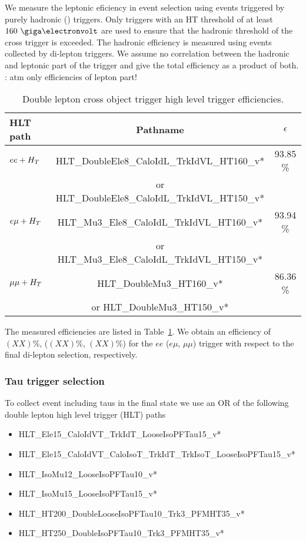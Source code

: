 We measure the leptonic eficiency in event selection
using events triggered by purely hadronic (\HT) triggers. Only triggers with an HT threshold of at least $160~\GeV$ are used to ensure that the hadronic threshold of the cross trigger is exceeded.
The hadronic efficiency is measured using
events collected by di-lepton triggers. We assume
no correlation between the hadronic and leptonic
part of the trigger and give the total efficiency
as a product of both.\\
\TODO: atm only efficiencies of lepton part!

\begin{table}[hbtp]
\caption{Double lepton \HT cross object trigger high level trigger efficiencies. \label{tab:TriggerHT}}
\begin{center}
\begin{tabular}{|l||c|c|} \hline
HLT path    &   Pathname        & $\epsilon$\\\hline \hline
$ee + H_T~$ &  HLT\_DoubleEle8\_CaloIdL\_TrkIdVL\_HT160\_v* & 93.85 \%\\
 & or HLT\_DoubleEle8\_CaloIdL\_TrkIdVL\_HT150\_v* & \\\hline
$e\mu + H_T~$& HLT\_Mu3\_Ele8\_CaloIdL\_TrkIdVL\_HT160\_v*  & 93.94 \%\\
 & or HLT\_Mu3\_Ele8\_CaloIdL\_TrkIdVL\_HT150\_v* & \\\hline
$\mu\mu + H_T~$& HLT\_DoubleMu3\_HT160\_v* & 86.36 \%\\
 & or HLT\_DoubleMu3\_HT150\_v* & \\\hline
\end{tabular}
\end{center}
\end{table}

The measured efficiencies are listed in Table~\ref{tab:TriggerHT}. 
We obtain an efficiency of $(XX)$\%, ($(XX)$\%, $(XX)$\%) 
for the $ee$ ($e\mu$, $\mu\mu$) trigger with respect to the final 
di-lepton selection, respectively.

\subsubsection{Tau trigger selection}
To collect event including taus in the final state
we use an OR of the following double lepton high level trigger (HLT) paths
\begin{itemize}
\item HLT\_Ele15\_CaloIdVT\_TrkIdT\_LooseIsoPFTau15\_v*
\item HLT\_Ele15\_CaloIdVT\_CaloIsoT\_TrkIdT\_TrkIsoT\_LooseIsoPFTau15\_v*
\item HLT\_IsoMu12\_LooseIsoPFTau10\_v*
\item HLT\_IsoMu15\_LooseIsoPFTau15\_v* 
\item HLT\_HT200\_DoubleLooseIsoPFTau10\_Trk3\_PFMHT35\_v*
\item HLT\_HT250\_DoubleIsoPFTau10\_Trk3\_PFMHT35\_v*
\end{itemize}

